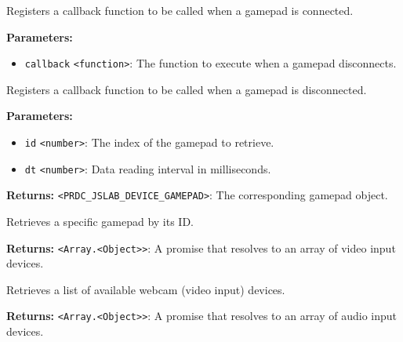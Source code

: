 \documentclass[12pt,a4paper]{article}
\begin{document}
\noindent Registers a callback function to be called when a gamepad is connected.

\vspace{5mm}
\noindent {}


\noindent \textbf{Parameters:}
\begin{itemize}
  \item \texttt{callback} \texttt{<function>}: The function to execute when a gamepad disconnects.
\end{itemize}

\noindent Registers a callback function to be called when a gamepad is disconnected.

\vspace{5mm}
\noindent {}


\noindent \textbf{Parameters:}
\begin{itemize}
  \item \texttt{id} \texttt{<number>}: The index of the gamepad to retrieve.
  \item \texttt{dt} \texttt{<number>}: Data reading interval in milliseconds.
\end{itemize}

\noindent \textbf{Returns:} \texttt{<PRDC\_JSLAB\_DEVICE\_GAMEPAD>}: The corresponding gamepad object.

\noindent Retrieves a specific gamepad by its ID.

\vspace{5mm}
\noindent {}


\noindent \textbf{Returns:} \texttt{<Array.<Object>>}: A promise that resolves to an array of video input devices.

\noindent Retrieves a list of available webcam (video input) devices.

\vspace{5mm}
\noindent {}


\noindent \textbf{Returns:} \texttt{<Array.<Object>>}: A promise that resolves to an array of audio input devices.
\end{document}
